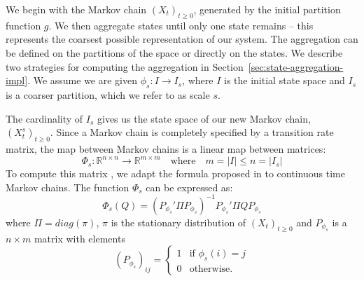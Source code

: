 We begin with the Markov chain $(X_t)_{t \ge 0}$, generated by the initial partition function $g$. We then aggregate states until only one state remains -- this represents the coarsest possible representation of our system. The aggregation can be defined on the partitions of the space or directly on the states. We describe two strategies for computing the aggregation in Section~\ref{sec:state-aggregation-impl}. We assume we are given $\phi_s: I\rightarrow I_s$, where $I$ is the initial state space and $I_s$ is a coarser partition, which we refer to as scale $s$. 

The cardinality of $I_s$ gives us the state space of our new Markov chain, $(X_t^{s})_{t \ge 0}$. Since a Markov chain is completely specified by a transition rate matrix, the map between Markov chains is a linear map between matrices: 
$$\Phi_s: \mathbb{R}^{n \times n} \rightarrow \mathbb{R}^{m \times m} \quad \mbox{where} \quad m = |I| \leq n =|I_s|$$
To compute this matrix , we adapt the formula proposed in \cite{5746509} to continuous time Markov chains. The function $\Phi_s$ can be expressed as:
\begin{equation}
	\label{eq:ctmc-state-aggregation}
	\Phi_s(Q) = (P_{\phi_s}' \Pi P_{\phi_s})^{-1} P_{\phi_s}' \Pi Q P_{\phi_s}
\end{equation}
where $\Pi = diag(\pi)$, $\pi$ is the stationary distribution of $(X_t)_{t \ge 0}$ and $P_{\phi_s}$ is a 
$n \times m$ matrix with elements
\begin{equation}
	\nonumber
	\left(P_{\phi_s}\right)_{ij} = 
		\left\{
			\begin{array}{ll}
				1 & \mbox{if } \phi_s(i) = j \\
				0 & \mbox{otherwise}.
			\end{array}
		\right.
\end{equation}
%
%
%
